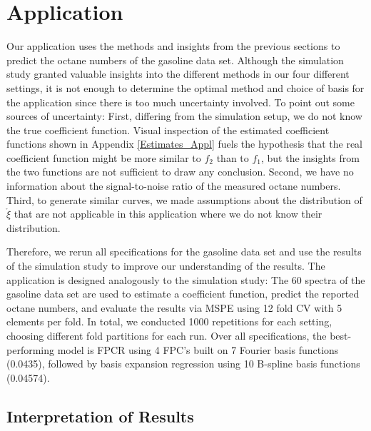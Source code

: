 \documentclass[11pt,twoside,a4paper]{article}
\begin{document}
	\section{Application}\label{Application}
		Our application uses the methods and insights from the previous sections to predict the octane numbers of the gasoline data set.
		Although the simulation study granted valuable insights into the different methods in our four different settings, it is not enough to determine the optimal method and choice of basis for the application since there is too much uncertainty involved. To point out some sources of uncertainty: First, differing from the simulation setup, we do not know the true coefficient function. Visual inspection of the estimated coefficient functions shown in Appendix \ref{Estimates_Appl} fuels the hypothesis that the real coefficient function might be more similar to $f_2$ than to $f_1$, but the insights from the two functions are not sufficient to draw any conclusion. Second, we have no information about the signal-to-noise ratio of the measured octane numbers. Third, to generate similar curves, we made assumptions about the distribution of $\mathring{\xi}$ that are not applicable in this application where we do not know their distribution.
		 
		Therefore, we rerun all specifications for the gasoline data set and use the results of the simulation study to improve our understanding of the results. The application is designed analogously to the simulation study: The 60 spectra of the gasoline data set are used to estimate a coefficient function, predict the reported octane numbers, and evaluate the results via MSPE using 12 fold CV with 5 elements per fold. In total, we conducted 1000 repetitions for each setting, choosing different fold partitions for each run. Over all specifications, the best-performing model is FPCR using 4 FPC's built on 7 Fourier basis functions (0.0435), followed by basis expansion regression using 10 B-spline basis functions (0.04574).
		

		
	\subsection{Interpretation of Results}
\end{document}

